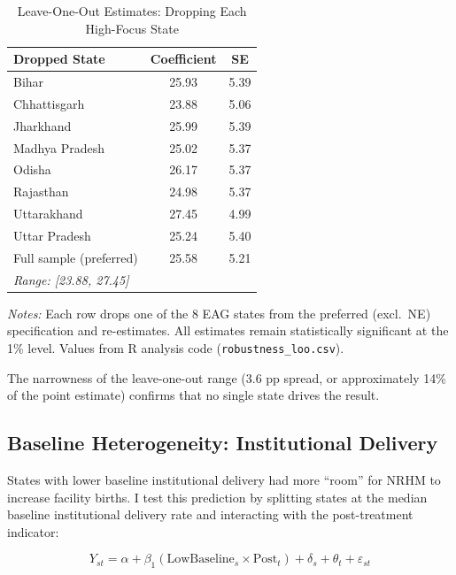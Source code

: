 \documentclass[12pt]{article}
\begin{document}
\begin{table}[H]
\centering
\caption{Leave-One-Out Estimates: Dropping Each High-Focus State}
\label{tab:loo_detail}
\begin{threeparttable}
\begin{tabular}{lcc}
\toprule
Dropped State & Coefficient & SE \\
\midrule
Bihar & 25.93 & 5.39 \\
Chhattisgarh & 23.88 & 5.06 \\
Jharkhand & 25.99 & 5.39 \\
Madhya Pradesh & 25.02 & 5.37 \\
Odisha & 26.17 & 5.37 \\
Rajasthan & 24.98 & 5.37 \\
Uttarakhand & 27.45 & 4.99 \\
Uttar Pradesh & 25.24 & 5.40 \\
\midrule
Full sample (preferred) & 25.58 & 5.21 \\
\multicolumn{3}{l}{\textit{Range: [23.88, 27.45]}} \\
\bottomrule
\end{tabular}
\begin{tablenotes}[flushleft]
\small
\item \textit{Notes:} Each row drops one of the 8 EAG states from the preferred (excl.\ NE) specification and re-estimates. All estimates remain statistically significant at the 1\% level. Values from R analysis code (\texttt{robustness\_loo.csv}).
\end{tablenotes}
\end{threeparttable}
\end{table}

The narrowness of the leave-one-out range (3.6 pp spread, or approximately 14\% of the point estimate) confirms that no single state drives the result.

\subsection{Baseline Heterogeneity: Institutional Delivery}

States with lower baseline institutional delivery had more ``room'' for NRHM to increase facility births. I test this prediction by splitting states at the median baseline institutional delivery rate and interacting with the post-treatment indicator:

\begin{equation}
Y_{st} = \alpha + \beta_1 (\text{LowBaseline}_s \times \text{Post}_t) + \delta_s + \theta_t + \varepsilon_{st}
\end{equation}
\end{document}
